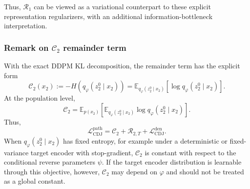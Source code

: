 \documentclass{article}
\newcommand{\E}{\mathbb{E}}
\begin{document}
Thus, $\mathcal R_1$ can be viewed as a variational counterpart to these
explicit representation regularizers, with an additional
information-bottleneck interpretation.

\subsubsection{Remark on $\mathcal{C}_2$ remainder term}
With the exact DDPM KL decomposition, the remainder term has the explicit form
\begin{equation}
\mathcal C_2(x_2)
:=
-H(q_\varphi(z_2^0\mid x_2))
=
\E_{q_\varphi(z_2^0\mid x_2)}
\left[
\log q_\varphi(z_2^0\mid x_2)
\right].
\end{equation}
At the population level,
\begin{equation}
\mathcal C_2
=
\E_{p(x_2)}
\left[
\E_{q_\varphi(z_2^0\mid x_2)}
\log q_\varphi(z_2^0\mid x_2)
\right].
\end{equation}
Thus,
\begin{equation}
\mathcal L_{\mathrm{CDJ}}^{\mathrm{path}}
=
\mathcal C_2
+
\mathcal R_{2,T}
+
\mathcal L_{\mathrm{CDJ}}^{\mathrm{den}}.
\end{equation}
When $q_\varphi(z_2^0\mid x_2)$ has fixed entropy, for example under a
deterministic or fixed-variance target encoder with stop-gradient, $\mathcal C_2$
is constant with respect to the conditional reverse parameters $\psi$. If the
target encoder distribution is learnable through this objective, however,
$\mathcal C_2$ may depend on $\varphi$ and should not be treated as a global
constant.

\newpage
\end{document}

